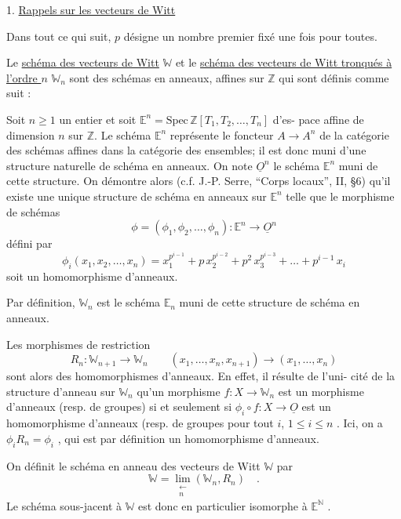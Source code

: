 \documentclass[11pt]{article}
\newcommand{\scanpage}[1]{\par\bigskip\noindent{\small\sffamily[scan #1]}\par}
\newcommand{\mspage}[1]{{\small\sffamily[p.\,#1]}}
\newcommand{\uline}[1]{\underline{#1}}
\begin{document}
1. \uline{Rappels sur les vecteurs de Witt}

Dans tout ce qui suit, $p$ désigne un nombre premier fixé une
fois pour toutes.

Le \uline{schéma des vecteurs de Witt} $\mathbb{W}$ et le \uline{schéma des vecteurs
de Witt tronqués à l'ordre $n$} $\mathbb{W}_n$ sont des schémas en anneaux, affines
sur $\mathbb{Z}$ qui sont définis comme suit :

Soit $n \geq 1$ un entier et soit $\mathbb{E}^n = \mathrm{Spec}\, \mathbb{Z}[T_1,T_2,\dots,T_n]$ d'es-%
pace affine de dimension $n$ sur $\mathbb{Z}$. Le schéma $\mathbb{E}^n$ représente le foncteur
$A \to A^n$ de la catégorie des schémas affines dans la catégorie des ensembles;
il est donc muni d'une structure naturelle de schéma en anneaux. On note
$\underline{O}^n$ le schéma $\mathbb{E}^n$ muni de cette structure. On démontre alors (c.f. J.-P.
Serre, ``Corps locaux'', II, §6) qu'il existe une unique structure de schéma
en anneaux sur $\mathbb{E}^n$ telle que le morphisme de schémas
\[ \phi = (\phi_1,\phi_2,\dots,\phi_n) : \mathbb{E}^n \to \underline{O}^n \]
défini par
\[ \phi_i(x_1,x_2,\dots,x_n) = x_1^{p^{i-1}} + p\, x_2^{p^{i-2}} + p^2\, x_3^{p^{i-3}} + \dots + p^{i-1}\, x_i \]
soit un homomorphisme d'anneaux.

Par définition, $\mathbb{W}_n$ est le schéma $\mathbb{E}_n$ muni de cette structure
de schéma en anneaux.

\mspage{16}

\clearpage
\scanpage{129/17}
Les morphismes de restriction
\[
R_n : \mathbb{W}_{n+1} \to \mathbb{W}_n \qquad (x_1,\ldots,x_n,x_{n+1}) \to (x_1,\ldots,x_n)
\]
sont alors des homomorphismes d'anneaux. En effet, il résulte de l'uni-%
cité de la structure d'anneau sur $\mathbb{W}_n$ qu'un morphisme $f : X \to \mathbb{W}_n$ est
un morphisme d'anneaux (resp. de groupes) si et seulement si $\phi_i \circ f : X \to \underline{O}$
est un homomorphisme d'anneaux (resp. de groupes pour tout $i$, $1 \leq i \leq n$ .
Ici, on a $\phi_i R_n = \phi_i$ , qui est par définition un homomorphisme d'anneaux.

On définit le schéma en anneau des vecteurs de Witt $\mathbb{W}$ par
\[
\mathbb{W} = \lim_{\substack{\leftarrow \\ n}} (\mathbb{W}_n , R_n) \quad .
\]
Le schéma sous-jacent à $\mathbb{W}$ est donc en particulier isomorphe à $\mathbb{E}^{\mathbb{N}}$ .
\end{document}
